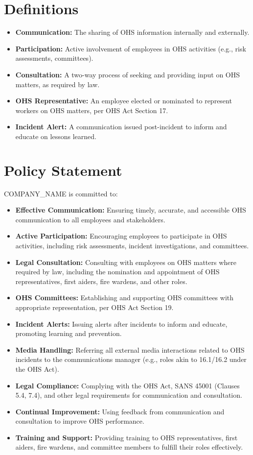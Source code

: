 \documentclass[12pt]{article}
\begin{document}
\section{Definitions}
\begin{itemize}
    \item \textbf{Communication:} The sharing of OHS information internally and externally.
    \item \textbf{Participation:} Active involvement of employees in OHS activities (e.g., risk assessments, committees).
    \item \textbf{Consultation:} A two-way process of seeking and providing input on OHS matters, as required by law.
    \item \textbf{OHS Representative:} An employee elected or nominated to represent workers on OHS matters, per OHS Act Section 17.
    \item \textbf{Incident Alert:} A communication issued post-incident to inform and educate on lessons learned.
\end{itemize}

\section{Policy Statement}
{{COMPANY_NAME}} is committed to:
\begin{itemize}
    \item \textbf{Effective Communication:} Ensuring timely, accurate, and accessible OHS communication to all employees and stakeholders.
    \item \textbf{Active Participation:} Encouraging employees to participate in OHS activities, including risk assessments, incident investigations, and committees.
    \item \textbf{Legal Consultation:} Consulting with employees on OHS matters where required by law, including the nomination and appointment of OHS representatives, first aiders, fire wardens, and other roles.
    \item \textbf{OHS Committees:} Establishing and supporting OHS committees with appropriate representation, per OHS Act Section 19.
    \item \textbf{Incident Alerts:} Issuing alerts after incidents to inform and educate, promoting learning and prevention.
    \item \textbf{Media Handling:} Referring all external media interactions related to OHS incidents to the communications manager (e.g., roles akin to 16.1/16.2 under the OHS Act).
    \item \textbf{Legal Compliance:} Complying with the OHS Act, SANS 45001 (Clauses 5.4, 7.4), and other legal requirements for communication and consultation.
    \item \textbf{Continual Improvement:} Using feedback from communication and consultation to improve OHS performance.
    \item \textbf{Training and Support:} Providing training to OHS representatives, first aiders, fire wardens, and committee members to fulfill their roles effectively.
\end{itemize}
\end{document}
